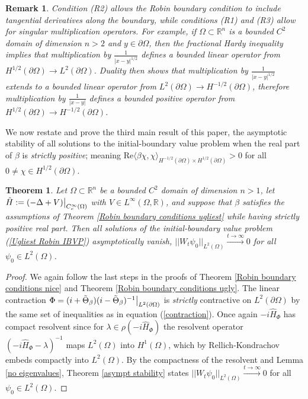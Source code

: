\documentclass{article}
\numberwithin{equation}{section}
\newtheorem{theoremmainagain}{Theorem}
\newtheorem{remark}{Remark}[section]
\begin{document}
\begin{remark}\label{Hardy remark}
    Condition \em (R2) \em allows the Robin boundary condition to include tangential derivatives along the boundary, while conditions \em(R1) \em and \em (R3) \em allow for singular multiplication operators. For example, if $\Omega\subset\mathbb{R}^n$ is a bounded $C^2$ domain of dimension $n> 2$ and $y \in \partial \Omega$, then the fractional Hardy inequality \cite{Hardy} implies that multiplication by $\frac{1}{|x-y|^{1/2}}$ defines a bounded linear operator from $H^{1/2}(\partial \Omega)\to L^2(\partial \Omega)$. Duality then shows that multiplication by $\frac{1}{|x-y|^{1/2}}$ extends to a bounded linear operator from $L^2(\partial \Omega)\to H^{-1/2}(\partial \Omega)$, therefore multiplication by $\frac{1}{|x-y|}$ defines a bounded positive operator from $H^{1/2}(\partial \Omega)\to H^{-1/2}(\partial \Omega)$.
\end{remark}
We now restate and prove the third main result of this paper, the asymptotic stability of all solutions to the initial-boundary value problem when the real part of $\beta$ is \textit{strictly positive}; meaning $\text{Re}\langle \beta \chi, \chi \rangle_{H^{-1/2}(\partial \Omega)\times H^{1/2}(\partial \Omega)}>0$ for all $0 \neq \chi \in H^{1/2}(\partial \Omega)$.
\begin{theoremmainagain}\label{Robin asymt stab again} Let $\Omega \subset \mathbb{R}^n$ be a bounded $C^2$ domain of dimension $n>1$, let $\hat{H}:=(-\Delta+V)\big{|}_{C_c^\infty(\Omega)}$ with $V \in L^\infty(\Omega,\mathbb{R})$, and suppose that $\beta$ satisfies the assumptions of Theorem \ref{Robin boundary conditions ugliest} while having strictly positive real part. Then all solutions of the initial-boundary value problem (\ref{Ugliest Robin IBVP}) asymptotically vanish, $||W_t\psi_0||_{L^2(\Omega)}\xrightarrow{t \to \infty}0$ for all $\psi_0 \in L^2(\Omega)$.
\end{theoremmainagain}
\begin{proof}
    We again follow the last steps in the proofs of Theorem \ref{Robin boundary conditions nice} and Theorem \ref{Robin boundary conditions ugly}. The linear contraction $\Phi=(i+\tilde{\Theta}_\beta)(i-\tilde{\Theta}_\beta)^{-1}\big{|}_{L^2(\partial \Omega)}$ is \textit{strictly} contractive on $L^2(\partial \Omega)$ by the same set of inequalities as in equation (\ref{contraction}). Once again $-i\hat{H}_\Phi$ has compact resolvent since for $\lambda \in \rho(-i\hat{H}_\Phi)$ the resolvent operator $(-i\hat{H}_\Phi-\lambda)^{-1}$ maps $L^2( \Omega)$ into $H^1( \Omega)$, which by Rellich-Kondrachov \cite{Brezis} embeds compactly into $L^2( \Omega)$. By the compactness of the resolvent and Lemma \ref{no eigenvalues}, Theorem \ref{asympt stability} states $||W_t\psi_0||_{L^2( \Omega)}\xrightarrow{t \to \infty}0$ for all $\psi_0 \in L^2(\Omega)$.
\end{proof}
\end{document}

